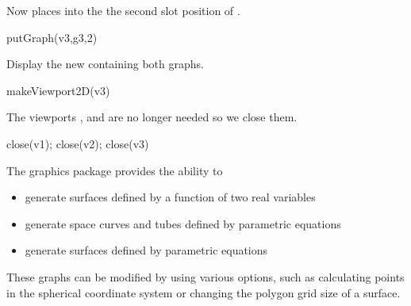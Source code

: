\begin{xtc}
\begin{xtccomment}
Now 
places  into the the second slot position of .
\end{xtccomment}
\begin{spadsrc}
putGraph(v3,g3,2) 
\end{spadsrc}
\end{xtc}
\begin{psXtc}
\begin{xtccomment}
Display the new  containing both graphs.
\end{xtccomment}
\begin{spadsrc}
makeViewport2D(v3) 
\end{spadsrc}
%
\end{psXtc}
\begin{nullXtc}
\begin{xtccomment}
The viewports ,  and  are no longer needed so
we close them.
\end{xtccomment}
\begin{spadsrc}
close(v1); close(v2); close(v3) 
\end{spadsrc}
\end{nullXtc}

%
%

%
The \Language{} \threedim{} graphics package provides the ability to
%
\begin{itemize}
%
\item generate surfaces defined by a function of two real variables
%
\item generate space curves and tubes defined by parametric equations
%
\item generate surfaces defined by parametric equations
\end{itemize}
These graphs can be modified by using various options, such as calculating
points in the spherical coordinate system or changing the polygon grid size
of a surface.


